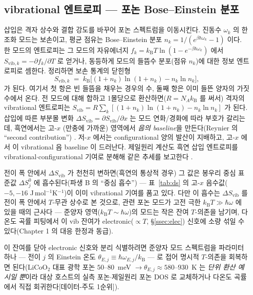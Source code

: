 \documentclass[11pt,a4paper]{article}
\newcommand{\vib}{\mathrm{vib}}
\newcommand{\kB}{k_{\mathrm B}}
\begin{document}
\subsection{vibrational 엔트로피 — 포논 Bose--Einstein 분포}
삽입은 격자 상수와 결합 강도를 바꾸어 포논 스펙트럼을 이동시킨다. 진동수 $\omega_k$ 의 한 조화 모드는 보손이고,
평균 점유는 Bose--Einstein 분포 $n_k=1/(e^{\beta\hbar\omega_k}-1)$ 이다. 한 모드의 엔트로피는 그 모드의 자유에너지
$f_k=\kB T\ln(1-e^{-\beta\hbar\omega_k})$ 에서 $S_{\vib,k}=-\partial f_k/\partial T$ 로 얻거나, 동등하게 모드의 들뜸수
분포(점유 $n_k$)에 대한 정보 엔트로피로 셈한다. 정리하면 보손 통계의 닫힌형
\begin{equation}
S_{\vib,k} \;=\; \kB\bigl[(1+n_k)\ln(1+n_k) - n_k\ln n_k\bigr],
\label{eq:Svib_mode}
\end{equation}
가 된다. 여기서 첫 항은 빈 들뜸을 채우는 경우의 수, 둘째 항은 이미 들뜬 양자의 가짓수에서 온다. 전 모드에 대해
합하고 1몰당으로 환산하면($R=N_A\kB$ 를 써서) 격자의 vibrational 엔트로피는
$S_\vib=R\sum_k[(1+n_k)\ln(1+n_k)-n_k\ln n_k]$ 가 된다. 삽입에 따른 부분몰
변화 $\Delta S_\vib=\partial S_\vib/\partial x$ 는 모드 연화/경화에 따라 부호가 갈리는데, 흑연에서는 고-$x$
(만충에 가까운) 영역에서 \emph{음의 baseline}을 만든다(Reynier 의 ``second contribution'') \cite{reynier2003}.
저-$x$ 에서는 configurational 양의 발산이 지배하고, 고-$x$ 에서 이 vibrational 음 baseline 이 드러난다. 제일원리
계산도 흑연 삽입 엔트로피를 vibrational$\cdot$configurational 기여로 분해해 같은 추세를 보고한다 \cite{jpcc2021}.

전이 폭 안에서 $\Delta S_\vib$ 가 천천히 변하면(흑연의 통상적 경우) 그 값은 봉우리 중심 표준값
$\Delta S^0_j$ 에 흡수된다(파생 B 의 ``중심 흡수'') — 표~\ref{tab:ds} 의 고-$x$ 음수값($-5,-16$
J\,mol$^{-1}$K$^{-1}$)이 이미 vibrational 기여를 품고 있다. 다만 이 흡수는 $\Delta S_\vib$ 를 전이 폭 안에서
$T$-무관 상수로 본 것으로, 관련 포논 모드가 고전 극한 $\kB T\gg\hbar\omega$ 에 있을 때의 근사다 — 준양자
영역($\kB T\!\sim\!\hbar\omega$)의 모드는 작은 잔여 $T$-의존을 남기며, 다온도 곡률 피팅에서 이 vib 잔여가
electronic($\propto T$, \S\ref{ssec:elec}) 신호에 소량 섞일 수 있다(Chapter 1 의 대응 한정과 동급).

이 잔여를 닫아 electronic 신호와 분리 식별하려면 준양자 모드 스펙트럼을 파라미터 하나 --- 전이 $j$ 의
Einstein 온도 $\theta_{E,j}\equiv\hbar\omega_{E,j}/\kB$ --- 로 접어 명시적 $T$-의존을 회복하면 된다(LiCoO$_2$
대표 광학 포논 $50$--$80$~meV $\to\theta_{E,j}\approx580$--$930$~K 는 \emph{단위 환산 예시일 뿐}이라 대상 호스트의
실측 포논$\cdot$제일원리 포논 DOS\cite{jpcc2021} 로 교체하거나 다온도 곡률에서 직접 회귀한다[데이터-주도 1순위]).
\end{document}
